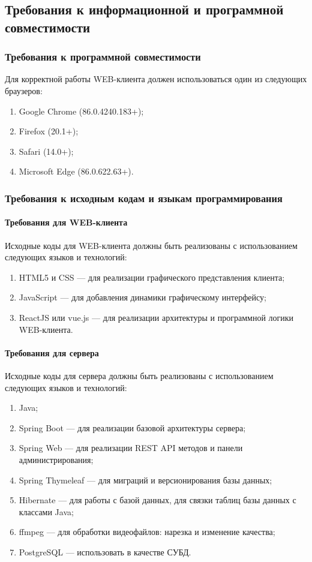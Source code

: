 \subsection{Требования к информационной и программной совместимости}

\subsubsection{Требования к программной совместимости}
Для корректной работы WEB-клиента должен использоваться один из следующих браузеров:
\begin{enumerate}[noitemsep]
    \item Google Chrome (86.0.4240.183+);
    \item Firefox (20.1+);
    \item Safari (14.0+);
    \item Microsoft Edge (86.0.622.63+).
\end{enumerate}

\subsubsection{Требования к исходным кодам и языкам программирования}
\paragraph{Требования для WEB-клиента}
Исходные коды для WEB-клиента должны быть реализованы с использованием следующих языков и технологий:
\begin{enumerate}[noitemsep]
    \item HTML5 и CSS — для реализации графического представления клиента;
    \item JavaScript — для добавления динамики графическому интерфейсу;
    \item ReactJS или vue.js — для реализации архитектуры и программной логики WEB-клиента.
\end{enumerate}

\paragraph{Требования для сервера}
Исходные коды для сервера должны быть реализованы с использованием следующих языков и технологий:
\begin{enumerate}[noitemsep]
    \item Java;
    \item Spring Boot — для реализации базовой архитектуры сервера;
    \item Spring Web — для реализации REST API методов и панели администрирования;
    \item Spring Thymeleaf — для миграций и версионирования базы данных;
    \item Hibernate — для работы с базой данных, для связки таблиц базы данных с классами Java;
    \item ffmpeg — для обработки видеофайлов: нарезка и изменение качества;
    \item PostgreSQL — использовать в качестве СУБД.
\end{enumerate}

